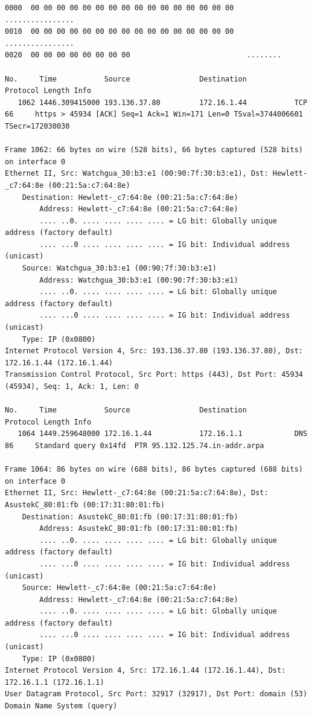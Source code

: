\documentclass[a4paper,11pt]{article}
\begin{document}
\begin{lstlisting}
0000  00 00 00 00 00 00 00 00 00 00 00 00 00 00 00 00   ................
0010  00 00 00 00 00 00 00 00 00 00 00 00 00 00 00 00   ................
0020  00 00 00 00 00 00 00 00                           ........

No.     Time           Source                Destination           Protocol Length Info
   1062 1446.309415000 193.136.37.80         172.16.1.44           TCP      66     https > 45934 [ACK] Seq=1 Ack=1 Win=171 Len=0 TSval=3744006601 TSecr=172030030

Frame 1062: 66 bytes on wire (528 bits), 66 bytes captured (528 bits) on interface 0
Ethernet II, Src: Watchgua_30:b3:e1 (00:90:7f:30:b3:e1), Dst: Hewlett-_c7:64:8e (00:21:5a:c7:64:8e)
    Destination: Hewlett-_c7:64:8e (00:21:5a:c7:64:8e)
        Address: Hewlett-_c7:64:8e (00:21:5a:c7:64:8e)
        .... ..0. .... .... .... .... = LG bit: Globally unique address (factory default)
        .... ...0 .... .... .... .... = IG bit: Individual address (unicast)
    Source: Watchgua_30:b3:e1 (00:90:7f:30:b3:e1)
        Address: Watchgua_30:b3:e1 (00:90:7f:30:b3:e1)
        .... ..0. .... .... .... .... = LG bit: Globally unique address (factory default)
        .... ...0 .... .... .... .... = IG bit: Individual address (unicast)
    Type: IP (0x0800)
Internet Protocol Version 4, Src: 193.136.37.80 (193.136.37.80), Dst: 172.16.1.44 (172.16.1.44)
Transmission Control Protocol, Src Port: https (443), Dst Port: 45934 (45934), Seq: 1, Ack: 1, Len: 0

No.     Time           Source                Destination           Protocol Length Info
   1064 1449.259648000 172.16.1.44           172.16.1.1            DNS      86     Standard query 0x14fd  PTR 95.132.125.74.in-addr.arpa

Frame 1064: 86 bytes on wire (688 bits), 86 bytes captured (688 bits) on interface 0
Ethernet II, Src: Hewlett-_c7:64:8e (00:21:5a:c7:64:8e), Dst: AsustekC_80:01:fb (00:17:31:80:01:fb)
    Destination: AsustekC_80:01:fb (00:17:31:80:01:fb)
        Address: AsustekC_80:01:fb (00:17:31:80:01:fb)
        .... ..0. .... .... .... .... = LG bit: Globally unique address (factory default)
        .... ...0 .... .... .... .... = IG bit: Individual address (unicast)
    Source: Hewlett-_c7:64:8e (00:21:5a:c7:64:8e)
        Address: Hewlett-_c7:64:8e (00:21:5a:c7:64:8e)
        .... ..0. .... .... .... .... = LG bit: Globally unique address (factory default)
        .... ...0 .... .... .... .... = IG bit: Individual address (unicast)
    Type: IP (0x0800)
Internet Protocol Version 4, Src: 172.16.1.44 (172.16.1.44), Dst: 172.16.1.1 (172.16.1.1)
User Datagram Protocol, Src Port: 32917 (32917), Dst Port: domain (53)
Domain Name System (query)


\end{lstlisting}
\end{document}
